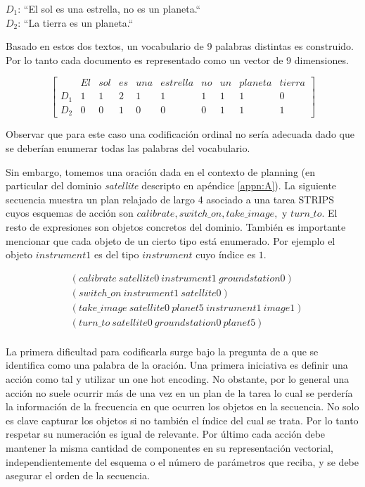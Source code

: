 \begin{center}
    $D_1$: ``El sol es una estrella, no es un planeta.`` \\
    $D_2$: ``La tierra es un planeta.``    
\end{center}

Basado en  estos dos textos, un vocabulario de 9 palabras distintas es
construido. Por lo tanto cada documento es representado como un vector de 9
dimensiones.

\begin{equation*}
    \begin{bmatrix}
        & El & sol & es & una & estrella & no & un & planeta & tierra \\
        D_1 & 1 & 1 & 2 & 1 & 1 & 1 & 1 & 1 & 0  \\
        D_2 & 0 & 0 & 1 & 0 & 0 & 0 & 1 & 1 & 1 
    \end{bmatrix}
\end{equation*}

Observar que para este caso una codificación ordinal no sería adecuada dado que
se deberían enumerar todas las palabras del vocabulario.

Sin embargo, tomemos una oración dada en el contexto de planning (en particular
del dominio \emph{satellite} descripto en apéndice \ref{appn:A}). La siguiente secuencia
muestra un plan relajado de largo 4 asociado a una tarea STRIPS cuyos esquemas
de acción son $calibrate, switch\_on, take\_image,$ y $turn\_to$. El resto de
expresiones son objetos concretos del dominio. También es importante mencionar
que cada objeto de un cierto tipo está enumerado. Por ejemplo el objeto
$instrument1$ es del tipo $instrument$ cuyo índice es $1$. 

\begin{align*}
    & (calibrate\ satellite0\ instrument1\ groundstation0) \\
    & (switch\_on\ instrument1\ satellite0) \\
    & (take\_image\ satellite0\ planet5\ instrument1\ image1) \\
    & (turn\_to\ satellite0\ groundstation0\ planet5) \\
\end{align*}

La primera dificultad para codificarla surge bajo la pregunta de a que se
identifica como una palabra de la oración. Una primera iniciativa es definir una
acción como tal y utilizar un one hot encoding. No obstante, por lo general
una acción no suele ocurrir más de una vez en un plan de la tarea lo cual se
perdería la información de la frecuencia en que ocurren los objetos en la
secuencia. No solo es clave capturar los objetos si no también el índice del
cual se trata. Por lo tanto respetar su numeración es igual de relevante. Por
último cada acción debe mantener la misma cantidad de componentes en su
representación vectorial, independientemente del esquema o el número de
parámetros que reciba, y se debe asegurar el orden de la secuencia.

